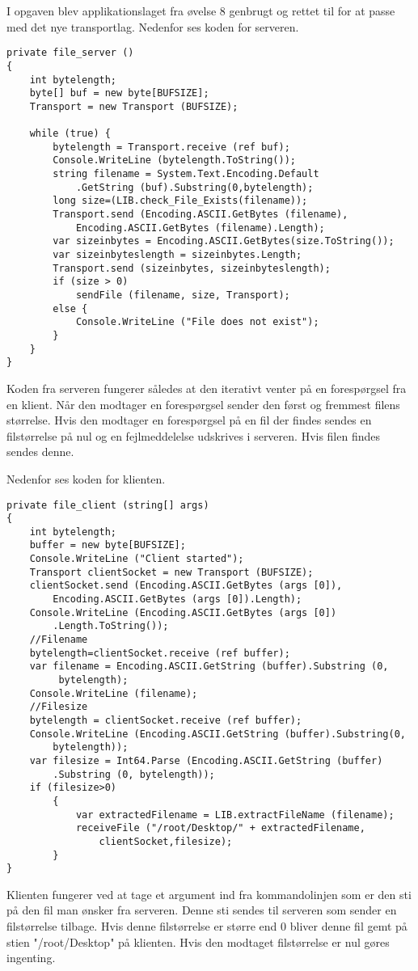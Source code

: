 I opgaven blev applikationslaget fra øvelse 8 genbrugt og rettet til for at passe med det nye transportlag. Nedenfor ses koden for serveren.

\begin{lstlisting}
private file_server ()
{
	int bytelength;
	byte[] buf = new byte[BUFSIZE];
	Transport = new Transport (BUFSIZE);

	while (true) {
		bytelength = Transport.receive (ref buf);
		Console.WriteLine (bytelength.ToString());
		string filename = System.Text.Encoding.Default
			.GetString (buf).Substring(0,bytelength);
		long size=(LIB.check_File_Exists(filename));
		Transport.send (Encoding.ASCII.GetBytes (filename), 
			Encoding.ASCII.GetBytes (filename).Length);
		var sizeinbytes = Encoding.ASCII.GetBytes(size.ToString());
		var sizeinbyteslength = sizeinbytes.Length;
		Transport.send (sizeinbytes, sizeinbyteslength);
		if (size > 0)
			sendFile (filename, size, Transport);
		else {
			Console.WriteLine ("File does not exist");
		}
	}
}
\end{lstlisting}

Koden fra serveren fungerer således at den iterativt venter på en forespørgsel fra en klient.  Når den modtager en forespørgsel sender den først og fremmest filens størrelse. Hvis den modtager en forespørgsel på en fil der findes sendes en filstørrelse på nul og en fejlmeddelelse udskrives i serveren. Hvis filen findes sendes denne.

Nedenfor ses koden for klienten.
\begin{lstlisting}
private file_client (string[] args)
{
	int bytelength;
	buffer = new byte[BUFSIZE];
	Console.WriteLine ("Client started");
	Transport clientSocket = new Transport (BUFSIZE);
	clientSocket.send (Encoding.ASCII.GetBytes (args [0]),
		Encoding.ASCII.GetBytes (args [0]).Length);
	Console.WriteLine (Encoding.ASCII.GetBytes (args [0])
		.Length.ToString());
	//Filename
	bytelength=clientSocket.receive (ref buffer);
	var filename = Encoding.ASCII.GetString (buffer).Substring (0,
		 bytelength);
	Console.WriteLine (filename);
	//Filesize
	bytelength = clientSocket.receive (ref buffer);
	Console.WriteLine (Encoding.ASCII.GetString (buffer).Substring(0,
		bytelength));
	var filesize = Int64.Parse (Encoding.ASCII.GetString (buffer)
		.Substring (0, bytelength));
	if (filesize>0)
		{
			var extractedFilename = LIB.extractFileName (filename);
			receiveFile ("/root/Desktop/" + extractedFilename, 
				clientSocket,filesize);
		}
}
\end{lstlisting}

Klienten fungerer ved at tage et argument ind fra kommandolinjen som er den sti på den fil man ønsker fra serveren. Denne sti sendes til serveren som sender en filstørrelse tilbage. Hvis denne filstørrelse er større end 0 bliver denne fil gemt på stien "/root/Desktop" på klienten. Hvis den modtaget filstørrelse er nul gøres ingenting.